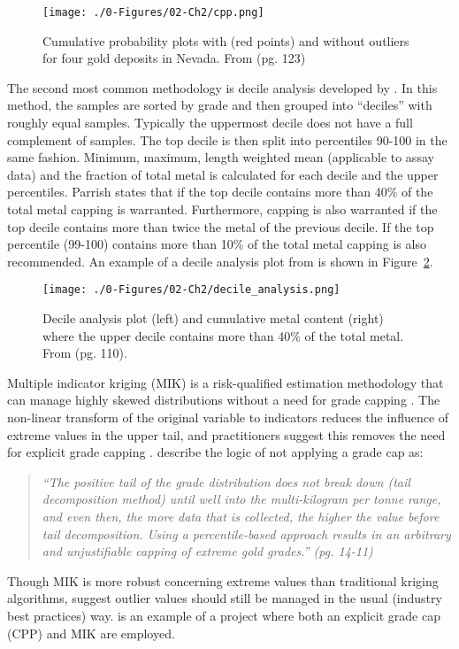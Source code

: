 \begin{figure}[htb!]
    \centering
    \texttt{[image: ./0-Figures/02-Ch2/cpp.png]}
    \caption{Cumulative probability plots with (red points) and without outliers for four gold deposits in Nevada. From \cite{fiore2021} (pg. 123)}
    \label{fig:cpp}
\end{figure}

The second most common methodology is decile analysis developed by \cite{parrish1997geologist}. In this method, the samples are sorted by grade and then grouped into ``deciles'' with roughly equal samples. Typically the uppermost decile does not have a full complement of samples. The top decile is then split into percentiles 90-100 in the same fashion. Minimum, maximum, length weighted mean (applicable to assay data) and the fraction of total metal is calculated for each decile and the upper percentiles. Parrish states that if the top decile contains more than 40\% of the total metal capping is warranted. Furthermore, capping is also warranted if the top decile contains more than twice the metal of the previous decile. If the top percentile (99-100) contains more than 10\% of the total metal capping is also recommended. An example of a decile analysis plot from \cite{cartier2020} is shown in Figure~\ref{fig:decile}.

\begin{figure}[htb!]
    \centering
    \texttt{[image: ./0-Figures/02-Ch2/decile\_analysis.png]}
    \caption{Decile analysis plot (left) and cumulative metal content (right) where the upper decile contains more than 40\% of the total metal. From \cite{cartier2020} (pg. 110).}
    \label{fig:decile}
\end{figure}

Multiple indicator kriging (MIK) is a risk-qualified estimation methodology that can manage highly skewed distributions without a need for grade capping \citep{journel1983nonparametric}. The non-linear transform of the original variable to indicators reduces the influence of extreme values in the upper tail, and practitioners suggest this removes the need for explicit grade capping \citep{pretium2020, ngm2020, tristar2021, cardinal2019}. \cite{pretium2020} describe the logic of not applying a grade cap as:
\blockquote{\textit{``The positive tail of the grade distribution does
        not break down (tail decomposition method) until well into the multi-kilogram per tonne range, and even then, the more data that is collected, the higher the value before tail decomposition. Using a percentile-based approach results in an arbitrary and unjustifiable capping of extreme gold grades.'' (pg. 14-11)}}
Though MIK is more robust concerning extreme values than traditional kriging algorithms, \cite{carvalho2017overview} suggest outlier values should still be managed in the usual (industry best practices) way. \cite{artemis2020} is an example of a project where both an explicit grade cap (CPP) and MIK are employed.

